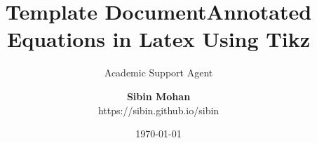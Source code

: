 \documentclass{article}
\title{Template Document}
\author{Academic Support Agent}
\date{\today}
\begin{document}
\maketitle

\title{Annotated Equations in Latex Using Tikz}

\author{
{\bf Sibin Mohan}\\
{https://sibin.github.io/sibin}
} %

\maketitle

\blindtext
\vspace{2\baselineskip}



\blindtext
\blindtext


\onecolumn

\blindtext


\blindtext


\blindtext
\end{document}
